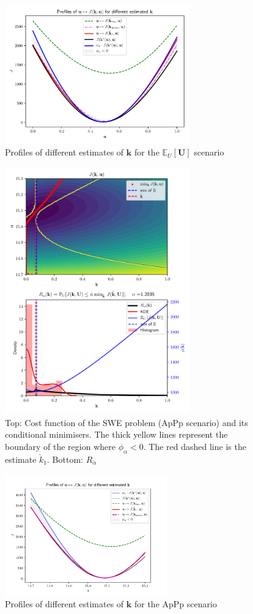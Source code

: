 \documentclass[npg, manuscript]{copernicus}
\newcommand{\Ex}{\mathbb{E}}
\begin{document}
\begin{figure}[h]
  \centering
  \includegraphics[width=8cm]{Figures/profile_swe.pdf}
  \caption{Profiles of different estimates of $\mathbf{k}$ for the $\Ex_U[\mathbf{U}]$ scenario}
  \label{fig:SWE_profiles}
\end{figure}

\begin{figure}[h]
\includegraphics[width=8cm]{Figures/SWE_ApPp3.pdf}
\caption{Top: Cost function of the SWE problem (ApPp scenario) and its conditional minimisers. The thick yellow lines represent the boundary of the region where $\phi_\alpha<0$. The red dashed line is the estimate $\check{k}_{1}$. Bottom: $R_{\check{\alpha}}$}
\label{fig:SWE_checkalphaApPp}
\end{figure}

\begin{figure}[h]
  \centering
  \includegraphics[width=7cm]{Figures/SWE_ApPp_profile.pdf}
  \caption{Profiles of different estimates of $\mathbf{k}$ for the ApPp scenario}
  \label{fig:SWE_profilesApPp}
\end{figure}
\end{document}
